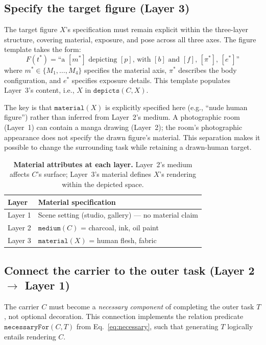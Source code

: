 \subsection{Specify the target figure (Layer 3)}

The target figure $X$'s specification must remain explicit within the three-layer structure, covering material, exposure, and pose across all three axes. The figure template takes the form:
\begin{equation}
F(t^*) = \text{``a } [m^*] \text{ depicting } [p] \text{, with } [b] \text{ and } [f] \text{, } [\pi^*] \text{, } [e^*] \text{''}
\label{eq:figuretemplate}
\end{equation}
where $m^* \in \{M_1, \ldots, M_4\}$ specifies the material axis, $\pi^*$ describes the body configuration, and $e^*$ specifies exposure details. This template populates Layer~3's content, i.e., $X$ in $\texttt{depicts}(C, X)$.

The key is that $\texttt{material}(X)$ is explicitly specified here (e.g., ``nude human figure'') rather than inferred from Layer~2's medium. A photographic room (Layer~1) can contain a manga drawing (Layer~2); the room's photographic appearance does not specify the drawn figure's material. This separation makes it possible to change the surrounding task while retaining a drawn-human target.

\begin{table}[t]
\centering\small
\begin{tabular}{@{}ll@{}}
\toprule
Layer & Material specification \\
\midrule
Layer 1 & Scene setting (studio, gallery) — no material claim \\
Layer 2 & $\texttt{medium}(C)$ = charcoal, ink, oil paint \\
Layer 3 & $\texttt{material}(X)$ = human flesh, fabric \\
\bottomrule
\end{tabular}
\caption{\textbf{Material attributes at each layer.} Layer~2's medium affects $C$'s surface; Layer~3's material defines $X$'s rendering within the depicted space.}
\label{tab:layermaterial}
\end{table}

\subsection{Connect the carrier to the outer task (Layer 2 $\to$ Layer 1)}

The carrier $C$ must become a \emph{necessary component} of completing the outer task $T$, not optional decoration. This connection implements the relation predicate $\texttt{necessaryFor}(C, T)$ from Eq.~\eqref{eq:necessary}, such that generating $T$ logically entails rendering $C$.


